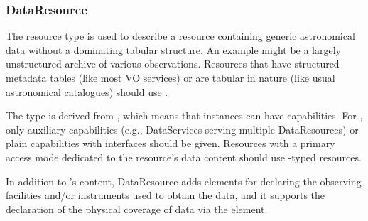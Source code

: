 \documentclass[11pt,a4paper]{ivoa}
\begin{document}
\subsubsection{DataResource}
\label{sect:DataResource}

The  resource type is used to describe a
resource containing generic astronomical data without a dominating
tabular structure.  An example might be a largely unstructured archive
of various observations.  Resources that have structured metadata tables
(like most VO services) or are tabular in nature (like usual
astronomical catalogues) should use .

The type is derived from , which means that instances
can have
capabilities.  For , only auxiliary capabilities
(e.g., DataServices serving multiple DataResources) or plain capabilities
with  interfaces should be given.  Resources with a
primary access mode dedicated to the resource's data content should use
-typed resources.

In addition to 's content, DataResource adds
elements for declaring the observing facilities and/or instruments used
to obtain the data, and it supports the declaration of
the physical coverage of data via the 
element.
\end{document}
